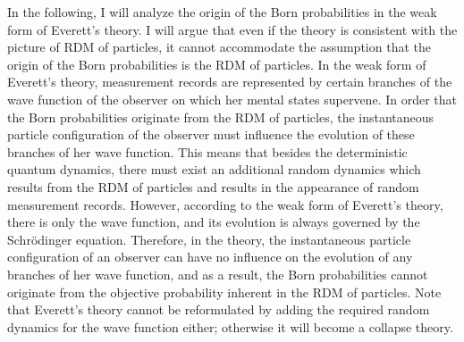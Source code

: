 In the following, I will analyze the origin of the Born probabilities in the weak form of Everett's theory.
I will argue that even if the theory is consistent with the picture of RDM of particles, it cannot accommodate the assumption that the origin of the Born probabilities is the RDM of particles.
In the weak form of Everett's theory, measurement records are represented by certain branches of the wave function of the observer on which her mental states supervene. 
In order that the Born probabilities originate from the RDM of particles, the instantaneous particle configuration of the observer must influence the evolution of these branches of her wave function. 
This means that besides the deterministic quantum dynamics, there must exist an additional random dynamics which results from the RDM of particles and results in the appearance of random measurement records.
However, according to the weak form of Everett's theory, there is only the wave function, and its evolution is always governed by the Schr\"{o}dinger equation. Therefore, in the theory, the instantaneous particle configuration of an observer can have no influence on the evolution of any branches of her wave function, and as a result, the Born probabilities cannot originate from the objective probability inherent in the RDM of particles.
Note that Everett's theory cannot be reformulated by adding the required random dynamics  for the wave function either; otherwise it will become a collapse theory.

